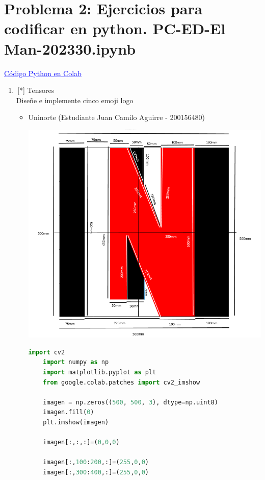 
\section*{Problema 2: Ejercicios para codificar en python. PC-ED-El Man-202330.ipynb}
\href{https://colab.research.google.com/drive/1vCZkVY7bXAuF_cyLY6kDvWL_nf0ut6MD?usp=sharing#scrollTo=a_GFcCmwZ7k7}{\textcolor{blue}{\underline{Código Python en Colab}}}
\begin{enumerate}
\item \,[*] Tensores \\ Diseñe e implemente cinco emoji logo
\begin{itemize}
    \item Uninorte (Estudiante Juan Camilo Aguirre - 200156480)
    \begin{center}
    \includegraphics[width=125mm]{imagenes-colab/maquetaun.png}
    \end{center}
    \begin{lstlisting}[language=Python]
    import cv2
    import numpy as np
    import matplotlib.pyplot as plt
    from google.colab.patches import cv2_imshow
    
    imagen = np.zeros((500, 500, 3), dtype=np.uint8)
    imagen.fill(0)
    plt.imshow(imagen)
    
    imagen[:,:,:]=(0,0,0)
    
    imagen[:,100:200,:]=(255,0,0)
    imagen[:,300:400,:]=(255,0,0)
    

\end{lstlisting}
\end{itemize}
\end{enumerate}
